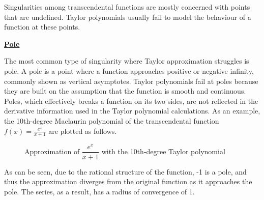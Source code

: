 \documentclass[a4paper, 12pt]{article}
\begin{document}
Singularities among transcendental functions are mostly concerned with points that are undefined. Taylor polynomials usually fail to model the behaviour of a function at these points.

\underline{\textbf{Pole}}

The most common type of singularity where Taylor approximation struggles is pole. A pole is a point where a function approaches positive or negative infinity, commonly shown as vertical asymptotes. Taylor polynomials fail at poles because they are built on the assumption that the function is smooth and continuous. Poles, which effectively breaks a function on its two sides, are not reflected in the derivative information used in the Taylor polynomial calculations. As an example, the 10th-degree Maclaurin polynomial of the transcendental function $f(x)=\frac{e^x}{x+1}$ are plotted as follows. 

\begin{figure}[H]
\centering
{}
\caption{Approximation of $\dfrac{e^x}{x+1}$ with the 10th-degree Taylor polynomial}
\end{figure}

As can be seen, due to the rational structure of the function, -1 is a pole, and thus the approximation diverges from the original function as it approaches the pole. The series, as a result, has a radius of convergence of 1.
\end{document}
